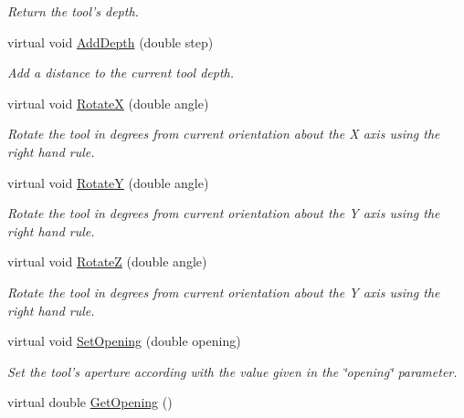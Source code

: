 \begin{DoxyCompactItemize}
\begin{DoxyCompactList}\small\item\em Return the tool's depth. \item\end{DoxyCompactList}\item 
virtual void \hyperlink{classvtkToolLaparoscopy_ac83d3abfa96db6faff943e22dac2ffe3}{AddDepth} (double step)
\begin{DoxyCompactList}\small\item\em Add a distance to the current tool depth. \item\end{DoxyCompactList}\item 
virtual void \hyperlink{classvtkToolLaparoscopy_a6894dddee203102828358697e8214974}{RotateX} (double angle)
\begin{DoxyCompactList}\small\item\em Rotate the tool in degrees from current orientation about the X axis using the right hand rule. \item\end{DoxyCompactList}\item 
virtual void \hyperlink{classvtkToolLaparoscopy_ae0245eaa9aa765a675da5135c4af422a}{RotateY} (double angle)
\begin{DoxyCompactList}\small\item\em Rotate the tool in degrees from current orientation about the Y axis using the right hand rule. \item\end{DoxyCompactList}\item 
virtual void \hyperlink{classvtkToolLaparoscopy_a3849ce4caa8283696433cb1ac0466bc5}{RotateZ} (double angle)
\begin{DoxyCompactList}\small\item\em Rotate the tool in degrees from current orientation about the Y axis using the right hand rule. \item\end{DoxyCompactList}\item 
\hypertarget{classvtkToolLaparoscopy_a870cb47bfdd67a9aecaba2fb7fbfa0ba}{
virtual void \hyperlink{classvtkToolLaparoscopy_a870cb47bfdd67a9aecaba2fb7fbfa0ba}{SetOpening} (double opening)}
\label{classvtkToolLaparoscopy_a870cb47bfdd67a9aecaba2fb7fbfa0ba}

\begin{DoxyCompactList}\small\item\em Set the tool's aperture according with the value given in the \char`\"{}opening\char`\"{} parameter. \item\end{DoxyCompactList}\item 
\hypertarget{classvtkToolLaparoscopy_aa255630f135c2e03eebb5fd0efb4fb15}{
virtual double \hyperlink{classvtkToolLaparoscopy_aa255630f135c2e03eebb5fd0efb4fb15}{GetOpening} ()}
\label{classvtkToolLaparoscopy_aa255630f135c2e03eebb5fd0efb4fb15}


\end{DoxyCompactItemize}
